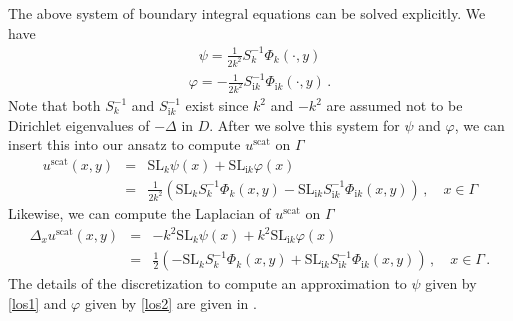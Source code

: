 \documentclass{article}
\numberwithin{equation}{section}
\begin{document}
{The above system of boundary integral equations can be solved explicitly. We have
\begin{eqnarray}\psi=\frac{1}{2k^2}S_k^{-1}\Phi_k(\cdot ,y) 
\label{los1}
\end{eqnarray}
\begin{eqnarray}
\varphi=-\frac{1}{2k^2}S_{\mathrm{i}k}^{-1}\Phi_{\mathrm{i}k}(\cdot ,y)\,.
\label{los2}
\end{eqnarray}
Note that both $S_k^{-1}$ and $S_{\mathrm{i}k}^{-1}$ exist since $k^2$ and $-k^2$ are assumed not to be Dirichlet eigenvalues of $-\Delta$ in $D$. After we solve this system for $\psi$ and $\varphi$, we can insert this into our ansatz to compute $u^{\text{scat}}$ on $\Gamma$
\begin{eqnarray*}
u^{\text{scat}}(x,y)&=&\mathrm{SL}_{k}\psi(x)+\mathrm{SL}_{\mathrm{i}k}\varphi(x)\\
&=&\frac{1}{2k^2}\left(\mathrm{SL}_{k}S_k^{-1}\Phi_k(x,y)-\mathrm{SL}_{\mathrm{i}k}S_{\mathrm{i}k}^{-1}\Phi_{\mathrm{i}k}(x,y)\right)\,,\quad x\in \Gamma
\end{eqnarray*}
Likewise, we can compute the Laplacian of $u^{\text{scat}}$ on $\Gamma$
\begin{eqnarray*}
\Delta_x u^{\text{scat}}(x,y)&=&-k^2\mathrm{SL}_{k}\psi(x)+k^2\mathrm{SL}_{\mathrm{i}k}\varphi(x)\\
&=&\frac{1}{2}\left(-\mathrm{SL}_{k}S_k^{-1}\Phi_k(x,y)+\mathrm{SL}_{\mathrm{i}k}S_{\mathrm{i}k}^{-1}\Phi_{\mathrm{i}k}(x,y)\right)\,,\quad x\in \Gamma\,.
\end{eqnarray*}
The details of the discretization to compute an approximation to $\psi$ given by \eqref{los1} and $\varphi$ given by \eqref{los2} are given in \cite[Section 4.3]{kleefeldhs}.



}
\end{document}
